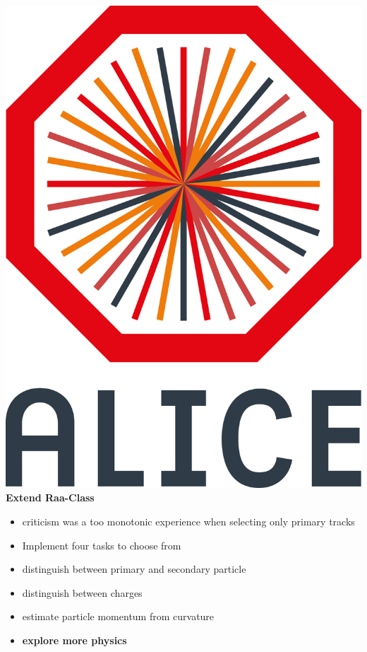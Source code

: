 \documentclass[aspectratio=1610,14pt,dvipsnames]{beamer}
\begin{document}
\begin{frame}{\includegraphics[height=0.07\textheight]{2012-Jul-04-4_Color_Logo_CB.png} \hspace{0.2cm}\textbf{Extend Raa-Class}}
  \begin{itemize}
    \item<1-> criticism was a too monotonic experience when selecting only primary tracks
    \item<2-> Implement four tasks to choose from
    \item<2-> distinguish between primary and secondary particle
    \item<2-> distinguish between charges
    \item<2-> estimate particle momentum from curvature
    \item<3-> \textbf{explore more physics}
  \end{itemize}
\end{frame}
\end{document}
